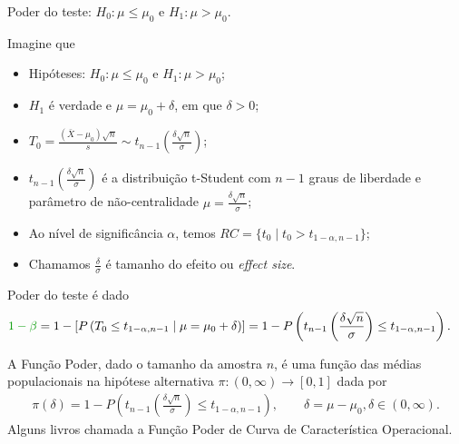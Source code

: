 \documentclass[8pt]{beamer}
\begin{document}
\begin{frame}{Poder do teste: $H_0:\mu \leq \mu_0$ e $H_1: \mu > \mu_0$.}

\small

Imagine que
\begin{itemize}
	\item Hipóteses: $H_0: \mu \leq \mu_0$ e $H_1: \mu > \mu_0$;
	\item $H_1$ é verdade e $\mu = \mu_0 + \delta$, em que $\delta > 0$;
	\item $T_0 = \frac{(\bar{X} - \mu_0)\sqrt{n}}{s}  \sim t_{n-1}\left( \frac{\delta \sqrt{n}}{\sigma} \right)$;
	\item $t_{n-1}\left(\frac{\delta\sqrt{n}}{\sigma}\right)$ é  a distribuição t-Student com $n-1$ graus de liberdade e parâmetro de não-centralidade $\mu = \frac{\delta \sqrt{n}}{\sigma}$;
	\item Ao nível de significância $\alpha$, temos $RC = \{ t_0 \mid t_0 > t_{1-\alpha, n-1}   \}$;
	\item Chamamos $\frac{\delta}{\sigma}$ é tamanho do efeito ou \textit{effect size}.
\end{itemize}
\vfill	

Poder do teste é dado
\begin{align*}
\textcolor{important}{1-\beta} &=1 - \left[P\left( T_0 \leq t_{1-\alpha, n-1} \mid \mu = \mu_0 + \delta \right)\right]  = 1- P\left( t_{n-1}\left( \frac{\delta\sqrt{n}}{\sigma} \right) \leq t_{1-\alpha, n-1}  \right).
\end{align*}
\vfill

A \textcolor{important}{Função Poder}, dado o tamanho da amostra $n$, é uma função das médias populacionais na hipótese alternativa  $\pi: (0, \infty) \longrightarrow [0,1]$ dada por
\begin{align*}
\pi(\delta) = 1 -  P\left( t_{n-1}\left( \frac{\delta\sqrt{n}}{\sigma} \right) \leq t_{1-\alpha, n-1} \right),\qquad \delta = \mu - \mu_0, \delta \in (0, \infty).
\end{align*}
Alguns livros chamada a Função Poder de \textcolor{important}{Curva de Característica Operacional.}

\normalsize	

\end{frame}
\end{document}
